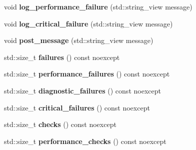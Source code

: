 \begin{DoxyCompactItemize}
void {\bfseries log\+\_\+performance\+\_\+failure} (std\+::string\+\_\+view message)
\item 
\mbox{\label{classsequoia_1_1unit__testing_1_1unit__test__logger_a635da87d7577bdaf495643152d98633c}} 
void {\bfseries log\+\_\+critical\+\_\+failure} (std\+::string\+\_\+view message)
\item 
\mbox{\label{classsequoia_1_1unit__testing_1_1unit__test__logger_a8706efb2ebb6013964ebbc65e22f2086}} 
void {\bfseries post\+\_\+message} (std\+::string\+\_\+view message)
\item 
\mbox{\label{classsequoia_1_1unit__testing_1_1unit__test__logger_ae54f0a1a4a5b2d6238e0d366982956f7}} 
std\+::size\+\_\+t {\bfseries failures} () const noexcept
\item 
\mbox{\label{classsequoia_1_1unit__testing_1_1unit__test__logger_a86249945f99dc1f888fbb5a1093385e9}} 
std\+::size\+\_\+t {\bfseries performance\+\_\+failures} () const noexcept
\item 
\mbox{\label{classsequoia_1_1unit__testing_1_1unit__test__logger_afffa6ee2ac910e83ad64627eb569401d}} 
std\+::size\+\_\+t {\bfseries diagnostic\+\_\+failures} () const noexcept
\item 
\mbox{\label{classsequoia_1_1unit__testing_1_1unit__test__logger_aeecc8d894810aac5a2bb9c847aa4333c}} 
std\+::size\+\_\+t {\bfseries critical\+\_\+failures} () const noexcept
\item 
\mbox{\label{classsequoia_1_1unit__testing_1_1unit__test__logger_a0dea61ea460a6a5718e7e8fe3cfbfc38}} 
std\+::size\+\_\+t {\bfseries checks} () const noexcept
\item 
\mbox{\label{classsequoia_1_1unit__testing_1_1unit__test__logger_a2df00e19d28cfd3a8419766481d0b74b}} 
std\+::size\+\_\+t {\bfseries performance\+\_\+checks} () const noexcept

\end{DoxyCompactItemize}
